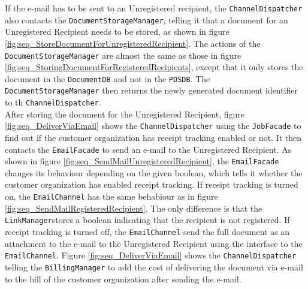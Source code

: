\documentclass[a4paper,10pt]{article}
\begin{document}
If the e-mail has to be sent to an Unregistered recipient, the \texttt{ChannelDispatcher} also contacts the \texttt{DocumentStorageManager}, telling it that a document for an Unregistered Recipient needs to be stored, as shown in figure \ref{fig:seq_StoreDocumentForUnregisteredRecipient}. The actions of the \texttt{DocumentStorageManager} are almost the same as those in figure \ref{fig:seq_StoringDocumentForRegisteredRecipients}, except that it only stores the document in the \texttt{DocumentDB} and not in the \texttt{PDSDB}. The \texttt{DocumentStorageManager} then returns the newly generated document identifier to th \texttt{ChannelDispatcher}.\\
After storing the document for the 
Unregistered Recipient, figure \ref{fig:seq_DeliverViaEmail} shows the \texttt{ChannelDispatcher} using the \texttt{JobFacade} to find out if the customer organization has receipt tracking enabled or not. It then contacts the \texttt{EmailFacade} to send an e-mail to the Unregistered Recipient. As shown in figure \ref{fig:seq_SendMailUnregisteredRecipient}, the \texttt{EmailFacade} changes its behaviour depending on the given boolean, which tells it whether the customer organization has enabled receipt tracking. If receipt tracking is turned on, the \texttt{EmailChannel} has the same behabiour as in figure \ref{fig:seq_SendMailRegisteredRecipient}. The only difference is that the \texttt{LinkManager}stores a boolean indicating that the recipient is not registered. If receipt tracking is turned off, the \texttt{EmailChannel} send the full document as an attachment to the e-mail to the Unregistered Recipient using the interface to the \texttt{EmailChannel}. Figure \ref{fig:seq_DeliverViaEmail} shows the \texttt{ChannelDispatcher} telling the \texttt{BillingManager} to add the cost of delivering the document via e-mail to the bill of the customer organization after sending the e-mail.
\end{document}
